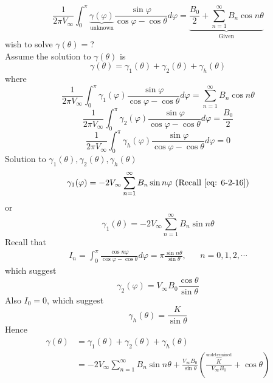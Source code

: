 \begin{itemize}
\begin{equation}
\frac{1}{2\pi V_\infty}\int_0^\pi\underbrace{\gamma(\varphi)}_{\text{unknown}}\frac{\sin\varphi}{\cos\varphi-\cos\theta}d\varphi = \underbrace{\frac{B_0}{2}+\sum_{n=1}^\infty B_n\cos n\theta}_{\text{Given}}
\label{eq: 6-2-43}
\end{equation}
wish to solve $\gamma(\theta)=$?\\
Assume the solution to $\gamma(\theta)$ is
\[
\gamma(\theta) = \gamma_1(\theta) + \gamma_2(\theta) + \gamma_h(\theta)
\]
where
\begin{equation}
\frac{1}{2\pi V_\infty}\int_0^\pi\gamma_1(\varphi)\frac{\sin\varphi}{\cos\varphi - \cos\theta}d\varphi = \sum_{n=1}^\infty B_n\cos n\theta
\label{eq: 6-2-45}
\end{equation}
\begin{equation}
\frac{1}{2\pi V_\infty}\int_0^\pi\gamma_2(\varphi)\frac{\sin\varphi}{\cos\varphi - \cos\theta}d\varphi = \frac{B_0}{2}
\label{eq: 6-2-46}
\end{equation}
\begin{equation}
\frac{1}{2\pi V_\infty}\int_0^\pi\gamma_h(\varphi)\frac{\sin\varphi}{\cos\varphi - \cos\theta}d\varphi = 0
\label{eq: 6-2-47}
\end{equation}
Solution to $\gamma_1(\theta),\gamma_2(\theta),\gamma_h(\theta)$
\[
\gamma_1(\varphi) = -2V_\infty\sum_{n=1}^\infty B_n\sin n\varphi\text{ (Recall \eqref{eq: 6-2-16})}
\]
or
\begin{equation}
\gamma_1(\theta) = -2V_\infty\sum_{n=1}^\infty B_n\sin n\theta
\label{eq: 6-2-48}
\end{equation}
Recall that
\begin{align*}
I_n = \int_0^\pi\frac{\cos n\varphi}{\cos\varphi - \cos\theta}d\varphi = \pi\frac{\sin n\theta}{\sin\theta}, && n=0,1,2,\cdots
\end{align*}
which suggest
\begin{equation}
\gamma_2(\varphi) = V_\infty B_0\frac{\cos\theta}{\sin\theta}
\label{eq: 6-2-49}
\end{equation}
Also $I_0=0$, which suggest
\begin{equation}
\gamma_h(\theta) = \frac{K}{\sin\theta}
\label{eq: 6-2-50}
\end{equation}
Hence 
\begin{align}
\gamma(\theta) 
&= \gamma_1(\theta) + \gamma_2(\theta) + \gamma_h(\theta)  \nonumber\\
&= -2V_\infty\sum_{n=1}^\infty B_n\sin n\theta + \frac{V_\infty B_0}{\sin\theta}\left(\frac{\overbrace{K}^{\text{undetermined}}}{V_\infty B_0} + \cos\theta\right)

\end{align}
\end{itemize}
